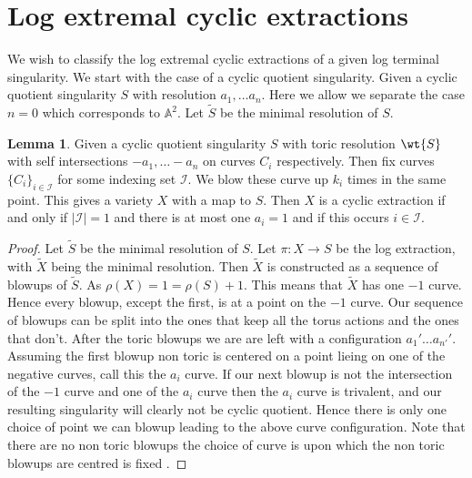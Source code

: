 \documentclass[11pt]{amsart}
\theoremstyle{definition}
\theoremstyle{definition}
\theoremstyle{definition}
\theoremstyle{definition}
\theoremstyle{definition}
\newtheorem{lem}[thm]{Lemma}
\theoremstyle{definition}
\theoremstyle{definition}
\theoremstyle{definition}
\begin{document}
 


\section{Log extremal cyclic extractions}

We wish to classify the log extremal cyclic extractions of a given log terminal singularity. We start with the case of a cyclic quotient singularity. Given a cyclic quotient singularity $S$ with resolution $a_1, \dots a_n$. Here we allow we separate the case $n=0$ which corresponds to $\mathbb{A}^2$. Let $\widetilde{S}$ be the minimal resolution of $S$.

\begin{lem}
Given a cyclic quotient singularity $S$ with toric resolution $\wt{S}$ with self intersections $-a_1, \dots -a_n$ on curves $C_i$ respectively. Then fix curves $\{C_i \}_{i \in \mathcal{I}}$ for some indexing set $\mathcal{I}$. We blow these curve up $k_i$ times in the same point. This gives a variety $X$ with a map to $S$. Then $X$ is a cyclic extraction if and only if $|\mathcal{I}| = 1$ and there is at most one $a_i = 1$ and if this occurs $i \in \mathcal{I}$.

\end{lem}

\begin{proof}
Let $\widetilde{S}$ be the minimal resolution of $S$. Let $\pi : X \rightarrow S$ be the log extraction, with $\widetilde{X}$ being the minimal resolution. Then $\widetilde{X}$ is constructed as a sequence of blowups of $\widetilde{S}$. As $\rho(X) = 1 = \rho(S) + 1$. This means that $\widetilde{X}$ has one $-1$ curve. Hence every blowup, except the first, is at a point on the $-1$ curve. Our sequence of blowups can be split into the ones that keep all the torus actions and the ones that don't. After the toric blowups we are are left with a configuration $a_1' \dots a_{n'}'$. Assuming the first blowup non toric is centered on a point  lieing on one of the negative curves, call this the $a_i$ curve. If our next blowup is not the intersection of the $-1$ curve and one of the $a_i$ curve then the $a_i$ curve is trivalent, and our resulting singularity will clearly not be cyclic quotient. Hence there is only one choice of point we can blowup leading to the above curve configuration. Note that there are no non toric blowups the choice of curve is  upon which the non toric blowups are centred is fixed .
\end{proof}
\end{document}
